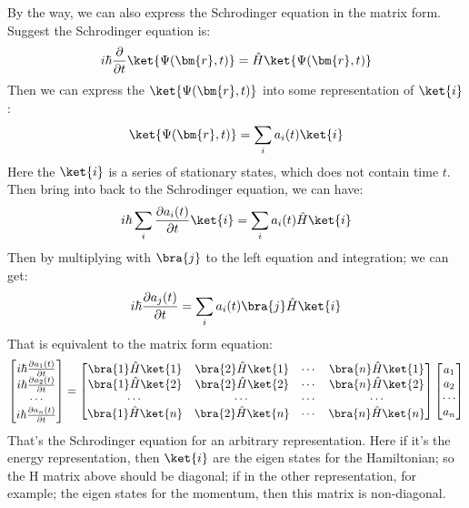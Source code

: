 By the way, we can also express the Schrodinger equation in the
matrix form. Suggest the Schrodinger equation is:
\begin{equation}\label{}
i\hbar\frac{\partial}{\partial t}\ket{\Psi(\bm{r},t)} =
\hat{H}\ket{\Psi(\bm{r},t)}
\end{equation}
Then we can express the $\ket{\Psi(\bm{r},t)}$ into some
representation of $\ket{i}$:
\begin{equation}\label{}
\ket{\Psi(\bm{r},t)} = \sum_{i}a_{i}(t)\ket{i}
\end{equation}
Here the $\ket{i}$ is a series of stationary states, which does not
contain time $t$. Then bring into back to the Schrodinger equation,
we can have:
\begin{equation}\label{}
i\hbar\sum_{i}\frac{\partial a_{i}(t)}{\partial t}\ket{i}
=\sum_{i}a_{i}(t)\hat{H}\ket{i}
\end{equation}
Then by multiplying with $\bra{j}$ to the left equation and
integration; we can get:
\begin{equation}\label{}
i\hbar\frac{\partial a_{j}(t)}{\partial t}
=\sum_{i}a_{i}(t)\bra{j}\hat{H}\ket{i}
\end{equation}
That is equivalent to the matrix form equation:
\begin{equation}\label{REPRESENTATIONeq:14}
\begin{bmatrix}
  i\hbar\frac{\partial a_{1}(t)}{\partial t} \\
  i\hbar\frac{\partial a_{2}(t)}{\partial t} \\
  \cdots \\
  i\hbar\frac{\partial a_{n}(t)}{\partial t} \\
\end{bmatrix}
=
\begin{bmatrix}
     \bra{1}\hat{H}\ket{1} & \bra{2}\hat{H}\ket{1} & \cdots & \bra{n}\hat{H}\ket{1} \\
     \bra{1}\hat{H}\ket{2} & \bra{2}\hat{H}\ket{2} & \cdots & \bra{n}\hat{H}\ket{2} \\
     \cdots                & \cdots                & \cdots &                \cdots \\
     \bra{1}\hat{H}\ket{n} & \bra{2}\hat{H}\ket{n} & \cdots & \bra{n}\hat{H}\ket{n} \\
   \end{bmatrix}
   \begin{bmatrix}
  a_{1} \\
  a_{2} \\
  \cdots \\
  a_{n} \\
\end{bmatrix}
\end{equation}
That's the Schrodinger equation for an arbitrary representation.
Here if it's the energy representation, then $\ket{i}$ are the eigen
states for the Hamiltonian; so the H matrix above should be
diagonal; if in the other representation, for example; the eigen
states for the momentum, then this matrix is non-diagonal.

